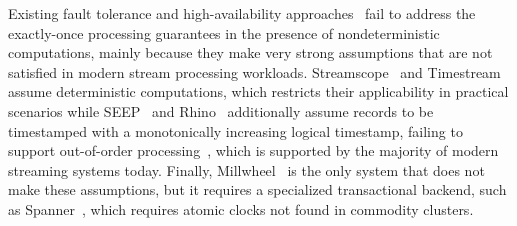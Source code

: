 \documentclass[sigconf]{acmart}
\begin{document}


Existing fault tolerance and high-availability approaches~\cite{Hwang2005HAA,BalazinskaBM05, Shah2004highly, delmonte2020rhino, ArmbrustDT18} fail to address the exactly-once processing guarantees in the presence of nondeterministic computations, mainly because they make very strong assumptions that are not satisfied in modern stream processing workloads. Streamscope~\cite{LinHZ16} and Timestream~\cite{QianHS13} assume deterministic computations, which restricts their applicability in practical scenarios while SEEP~\cite{migliavacca2010seep} and Rhino~\cite{delmonte2020rhino} additionally assume records to be timestamped with a monotonically increasing logical timestamp, failing to support out-of-order processing~\cite{li2008out}, which is supported by the majority of modern streaming systems today.
Finally, Millwheel~\cite{akidau2013millwheel} is the only system that does not make these assumptions, but it requires a specialized transactional backend, such as Spanner~\cite{spanner}, which requires atomic clocks not found in commodity clusters. 
\end{document}
